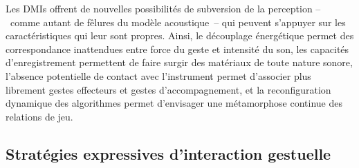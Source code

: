\indent Les \glspl{DMI} offrent de nouvelles possibilités de subversion de la perception --~comme autant de fêlures du modèle acoustique~-- qui peuvent s'appuyer sur les caractéristiques qui leur sont propres. Ainsi, le découplage énergétique permet des correspondance inattendues entre force du geste et intensité du son, les capacités d'enregistrement permettent de faire surgir des matériaux de toute nature sonore, l'absence potentielle de contact avec l'instrument permet d'associer plus librement gestes effecteurs et gestes d'accompagnement, et la reconfiguration dynamique des algorithmes permet d'envisager une métamorphose continue des relations de jeu.

\subsection{Stratégies expressives d'interaction gestuelle}

